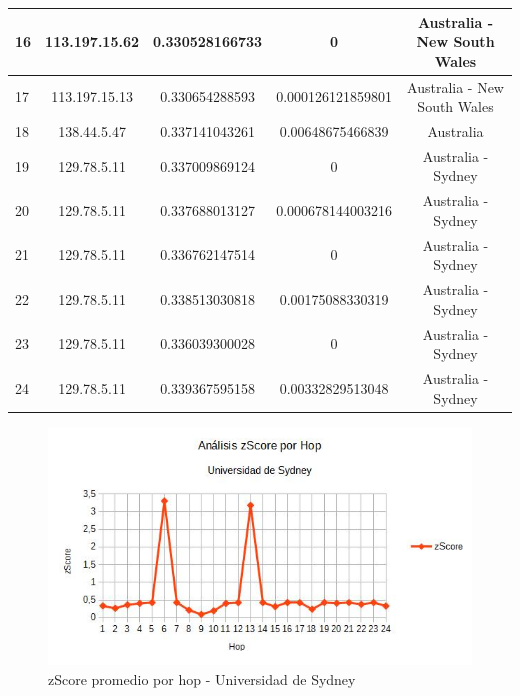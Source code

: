 \begin{tabular}{ | l | c | c | c | c |}
  \hline
  16  &  113.197.15.62  &  0.330528166733  &  0 & Australia - New South Wales\\
  \hline
  17  &  113.197.15.13  &  0.330654288593  &  0.000126121859801 & Australia - New South Wales\\
  \hline
  18  &  138.44.5.47  &  0.337141043261  &  0.00648675466839 & Australia\\
  \hline
  19  &  129.78.5.11  &  0.337009869124  &  0 & Australia - Sydney\\
  \hline
  20  &  129.78.5.11  &  0.337688013127  &  0.000678144003216 & Australia - Sydney\\
  \hline
  21  &  129.78.5.11  &  0.336762147514  &  0 & Australia - Sydney\\
  \hline
  22  &  129.78.5.11  &  0.338513030818  &  0.00175088330319 & Australia - Sydney\\
  \hline
  23  &  129.78.5.11  &  0.336039300028  &  0 & Australia - Sydney\\
  \hline
  24  &  129.78.5.11  &  0.339367595158  &  0.00332829513048 & Australia - Sydney\\
  \hline

\end{tabular}

\bigskip

\begin{figure}[H]
\centering
\includegraphics[width=1\textwidth]{graficos/zScore_Australia.jpg}
\caption{zScore promedio por hop - Universidad de Sydney}
\label{Australia_zs}
\end{figure}

